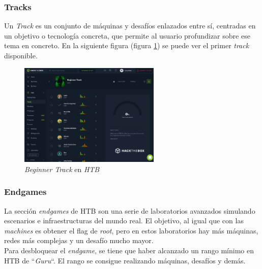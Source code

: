 \subsubsection{Tracks}
Un \textit{Track} es un conjunto de máquinas y desafíos enlazados entre sí, centradas en un objetivo o tecnología concreta, que permite al usuario profundizar sobre ese tema en concreto. En la siguiente figura (figura \ref{fig:htb-tracks}) se puede ver el primer \textit{track} disponible.
\begin{figure}[h]
    \centering
    \includegraphics[width=0.6\textwidth]{images/sections/stateOfTheArt/htb-tracks.png}
    \caption{\textit{Beginner Track} en \textit{\acrshort{HTB}}}
    \label{fig:htb-tracks}
\end{figure}

\subsubsection{Endgames}
La sección \textit{endgames} de \acrshort{HTB} son una serie de laboratorios avanzados simulando escenarios e infraestructuras del mundo real. El objetivo, al igual que con las \textit{machines} es obtener el flag de \textit{root}, pero en estos laboratorios hay más máquinas, redes más complejas y un desafío mucho mayor.\\

Para desbloquear el \textit{endgame}, se tiene que haber alcanzado un rango mínimo en \acrshort{HTB} de ``\textit{Guru}``. El rango se consigue realizando máquinas, desafíos y demás.
